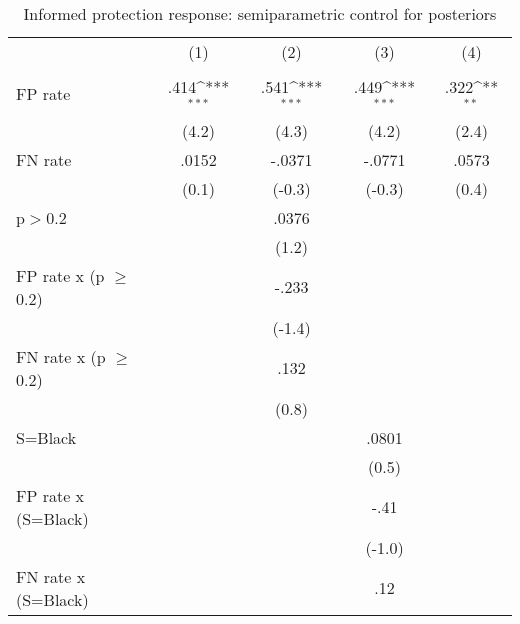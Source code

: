 \begin{table}[htbp]\centering
\def\sym#1{\ifmmode^{#1}\else\(^{#1}\)\fi}
\caption{Informed protection response: semiparametric control for posteriors}
\begin{tabular}{l*{4}{c}}
\hline\hline
                &\multicolumn{1}{c}{(1)}&\multicolumn{1}{c}{(2)}&\multicolumn{1}{c}{(3)}&\multicolumn{1}{c}{(4)}\\
                &\multicolumn{1}{c}{}&\multicolumn{1}{c}{}&\multicolumn{1}{c}{}&\multicolumn{1}{c}{}\\
\hline
FP rate         &     .414\sym{***}&     .541\sym{***}&     .449\sym{***}&     .322\sym{**} \\
                &    (4.2)         &    (4.3)         &    (4.2)         &    (2.4)         \\
FN rate         &    .0152         &   -.0371         &   -.0771         &    .0573         \\
                &    (0.1)         &   (-0.3)         &   (-0.3)         &    (0.4)         \\
p$>$0.2         &                  &    .0376         &                  &                  \\
                &                  &    (1.2)         &                  &                  \\
FP rate x (p $\geq$ 0.2)&                  &    -.233         &                  &                  \\
                &                  &   (-1.4)         &                  &                  \\
FN rate x (p $\geq$ 0.2)&                  &     .132         &                  &                  \\
                &                  &    (0.8)         &                  &                  \\
S=Black         &                  &                  &    .0801         &                  \\
                &                  &                  &    (0.5)         &                  \\
FP rate x (S=Black)&                  &                  &     -.41         &                  \\
                &                  &                  &   (-1.0)         &                  \\
FN rate x (S=Black)&                  &                  &      .12         &                  \\

\end{tabular}
\end{table}

